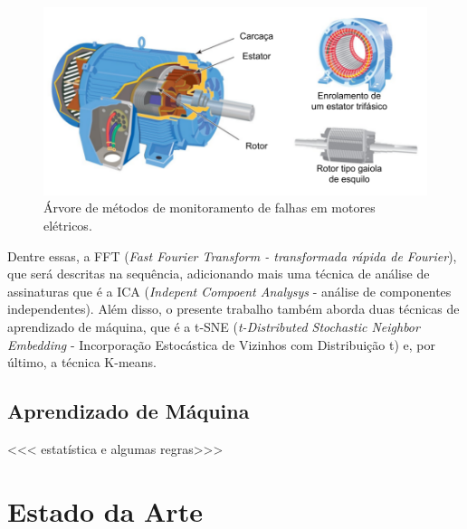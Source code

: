 \begin{figure}[H]
    \caption{Árvore de métodos de monitoramento de falhas em motores elétricos.}
    \begin{center}
        \includegraphics[scale=0.9, page=8]{referencial/img/imagens_referencial.pdf}
    \end{center}
    \label{fig:monitoring_methods_rilski_p78}
\end{figure}

Dentre essas, a FFT (\textit{Fast Fourier Transform - transformada rápida de Fourier}), que será descritas na sequência, 
adicionando mais uma técnica de análise de assinaturas que é a ICA (\textit{Indepent Compoent Analysys} - análise de componentes independentes).
Além disso, o presente trabalho também aborda duas técnicas de aprendizado de máquina, que  é a t-SNE 
(\textit{t-Distributed Stochastic Neighbor Embedding} - Incorporação Estocástica de Vizinhos com Distribuição t) e, por último, 
 a técnica K-means.


% 

\subsection{Aprendizado de Máquina}


<<< estatística e algumas regras>>>


% 

\section{Estado da Arte}

